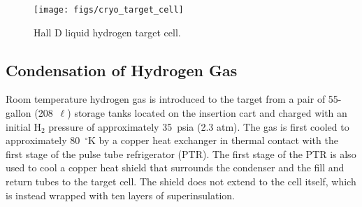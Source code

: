 
\begin{figure}[h]
\begin{center}
      \texttt{[image: figs/cryo\_target\_cell]}
\end{center}
\caption{
Hall D liquid hydrogen target cell.
\label{fig:tgt:cell}}
\end{figure}

 
\subsection[Condensation of Hydrogen Gas]{Condensation of Hydrogen Gas 
\label{sec:tgt:condens}}

Room temperature hydrogen gas is introduced to the target from a pair
of 55-gallon (208~$\ell$) storage tanks located on the insertion cart
and charged with an initial H$_2$ pressure of approximately 35~psia (2.3
atm).  The gas is first cooled to approximately 80~$^\circ$K by a copper heat
exchanger in thermal contact with the first stage of the pulse tube
refrigerator (PTR).  The first stage of the PTR is also used to cool a
copper heat shield that surrounds the condenser and the fill and
return tubes to the target cell.  The shield does not extend to the
cell itself, which is instead wrapped with ten layers of
superinsulation.

